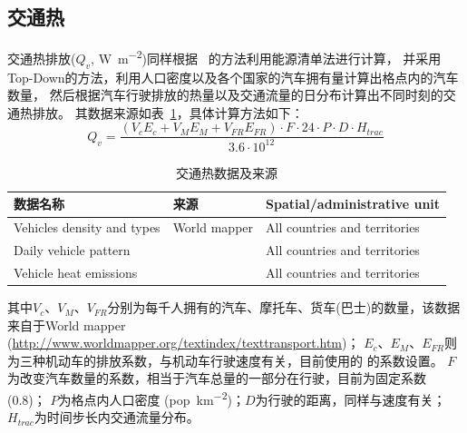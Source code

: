 \subsection{交通热}
交通热排放($Q_v$, \unit{W.m^{-2}})同样根据~\citet{allen2011} 的方法利用能源清单法进行计算，
并采用Top-Down的方法，利用人口密度以及各个国家的汽车拥有量计算出格点内的汽车数量，
然后根据汽车行驶排放的热量以及交通流量的日分布计算出不同时刻的交通热排放。
其数据来源如表~\ref{tab:交通热数据及来源}，具体计算方法如下：
\begin{equation}
Q_{v}=\frac{\left(V_{c} E_{c}+V_{M} E_{M}+V_{F R} E_{F R}\right) \cdot F \cdot 24 \cdot P \cdot D \cdot H_{t r a c}}{3.6 \cdot 10^{12}}
\end{equation}
\begin{table}[]
    \centering
\caption{交通热数据及来源}
\label{tab:交通热数据及来源}
    \begin{tabular}{@{}lll@{}}
    \toprule
    数据名称                       & 来源                          & Spatial/administrative unit   \\ \midrule
    Vehicles density and types & World mapper                & All countries and territories \\
    Daily vehicle pattern      & \citet{Hallenbeck1997} & All countries and territories \\
    Vehicle heat emissions     & \citet{smith2009estimating}       & All countries and territories \\ \bottomrule
    \end{tabular}
    \end{table}
其中$V_c$、$V_M$、$V_{FR}$分别为每千人拥有的汽车、摩托车、货车(巴士)的数量，该数据来自于World mapper
(\url{http://www.worldmapper.org/textindex/texttransport.htm})；
$E_c$、$E_M$、$E_{FR}$则为三种机动车的排放系数，与机动车行驶速度有关，目前使用的 \citet{smith2009estimating} 的系数设置。
$F$为改变汽车数量的系数，相当于汽车总量的一部分在行驶，目前为固定系数(0.8)；
$P$为格点内人口密度 (\unit{pop.km^{-2}})；$D$为行驶的距离，同样与速度有关；$H_{trac}$为时间步长内交通流量分布。